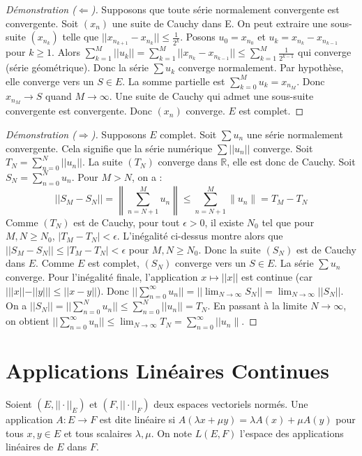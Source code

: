 \documentclass{article}
\begin{document}
\begin{proof}[Démonstration ($\Leftarrow$)]
Supposons que toute série normalement convergente est convergente. Soit $(x_n)$ une suite de Cauchy dans E. On peut extraire une sous-suite $(x_{n_k})$ telle que $||x_{n_{k+1}} - x_{n_k}|| \le \frac{1}{2^k}$.
Posons $u_0 = x_{n_0}$ et $u_k = x_{n_k} - x_{n_{k-1}}$ pour $k \ge 1$.
Alors $\sum_{k=1}^M ||u_k|| = \sum_{k=1}^M ||x_{n_k} - x_{n_{k-1}}|| \le \sum_{k=1}^M \frac{1}{2^{k-1}}$ qui converge (série géométrique).
Donc la série $\sum u_k$ converge normalement. Par hypothèse, elle converge vers un $S \in E$.
La somme partielle est $\sum_{k=0}^M u_k = x_{n_M}$. Donc $x_{n_M} \to S$ quand $M \to \infty$.
Une suite de Cauchy qui admet une sous-suite convergente est convergente. Donc $(x_n)$ converge. $E$ est complet.
\end{proof}

\begin{proof}[Démonstration ($\Rightarrow$)]
Supposons $E$ complet. Soit $\sum u_n$ une série normalement convergente. Cela signifie que la série numérique $\sum ||u_n||$ converge. Soit $T_N = \sum_{n=0}^N ||u_n||$. La suite $(T_N)$ converge dans $\mathbb{R}$, elle est donc de Cauchy.
Soit $S_N = \sum_{n=0}^N u_n$. Pour $M > N$, on a :
\[
||S_M - S_N|| = \left\| \sum_{n=N+1}^M u_n \right\| \le \sum_{n=N+1}^M \|u_n\| = T_M - T_N
\]
Comme $(T_N)$ est de Cauchy, pour tout $\epsilon > 0$, il existe $N_0$ tel que pour $M, N \ge N_0$, $|T_M - T_N| < \epsilon$.
L'inégalité ci-dessus montre alors que $||S_M - S_N|| \le |T_M - T_N| < \epsilon$ pour $M, N \ge N_0$.
Donc la suite $(S_N)$ est de Cauchy dans $E$. Comme $E$ est complet, $(S_N)$ converge vers un $S \in E$. La série $\sum u_n$ converge.
Pour l'inégalité finale, l'application $x \mapsto ||x||$ est continue (car $|||x|| - ||y||| \le ||x-y||$).
Donc $||\sum_{n=0}^\infty u_n|| = ||\lim_{N \to \infty} S_N|| = \lim_{N \to \infty} ||S_N||$.
On a $||S_N|| = ||\sum_{n=0}^N u_n|| \le \sum_{n=0}^N ||u_n|| = T_N$.
En passant à la limite $N \to \infty$, on obtient $||\sum_{n=0}^\infty u_n|| \le \lim_{N \to \infty} T_N = \sum_{n=0}^\infty ||u_n\|$.
\end{proof}


\section{Applications Linéaires Continues}

Soient $(E, ||\cdot||_E)$ et $(F, ||\cdot||_F)$ deux espaces vectoriels normés. Une application $A: E \to F$ est dite linéaire si $A(\lambda x + \mu y) = \lambda A(x) + \mu A(y)$ pour tous $x, y \in E$ et tous scalaires $\lambda, \mu$. On note $L(E, F)$ l'espace des applications linéaires de $E$ dans $F$.
\end{document}
